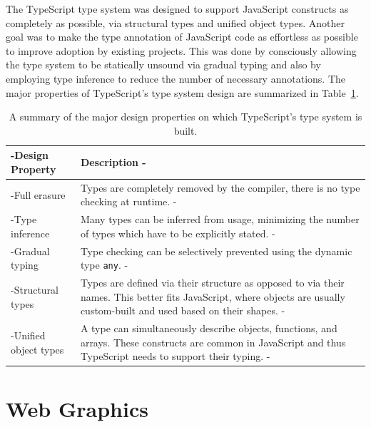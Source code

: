 The TypeScript type system was designed to support JavaScript
constructs as completely as possible, via structural types and unified
object types. Another goal was to make the type annotation of
JavaScript code as effortless as possible to improve adoption by
existing projects. This was done by consciously allowing the type
system to be statically unsound via gradual typing and also by
employing type inference to reduce the number of necessary
annotations. The major properties of TypeScript's type system design
are summarized in Table~\ref{tab:TSTypeSystemDesignProperties}.


\begin{table}[tp]
\tablestretch
{}
\centering
\begin{tabularx}{\linewidth}{>{\kern-\tabcolsep}lX<{\kern-\tabcolsep}}
\toprule
Design Property & Description \\
\midrule
Full erasure         &
Types are completely removed by the compiler, there is no type checking at runtime. \\
%
Type inference       &
Many types can be inferred from usage, minimizing the number of types which have to be explicitly stated. \\
%
Gradual typing       &
Type checking can be selectively prevented using the dynamic type \lstinline{any}. \\
%
Structural types     &
Types are defined via their structure as opposed to via their names.
This better fits JavaScript, where objects are usually custom-built and used based on their shapes. \\
%
Unified object types &
A type can simultaneously describe objects, functions, and arrays.
These constructs are common in JavaScript and thus TypeScript needs to support their typing. \\
\bottomrule
\end{tabularx}
\caption[TypeScript Type System Design Properties]{
A summary of the major design properties on which TypeScript's type system is built.
}
\label{tab:TSTypeSystemDesignProperties}
\end{table}









\section{Web Graphics}
\label{sec:WebGraphics}

